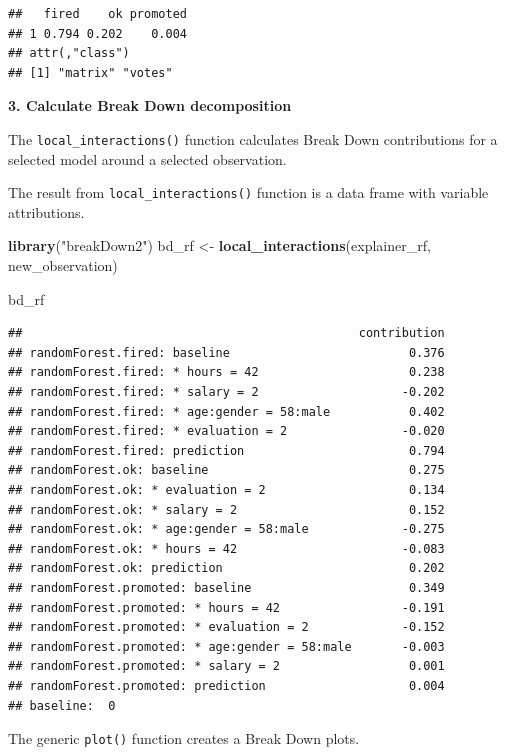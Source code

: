 \documentclass[]{krantz}
\newenvironment{Shaded}{\begin{snugshade}}{\end{snugshade}}
\newcommand{\KeywordTok}[1]{\textcolor[rgb]{0.13,0.29,0.53}{\textbf{#1}}}
\newcommand{\NormalTok}[1]{#1}
\newcommand{\StringTok}[1]{\textcolor[rgb]{0.31,0.60,0.02}{#1}}
\theoremstyle{definition}
\theoremstyle{definition}
\theoremstyle{definition}
\theoremstyle{remark}
\begin{document}
\begin{verbatim}
##   fired    ok promoted
## 1 0.794 0.202    0.004
## attr(,"class")
## [1] "matrix" "votes"
\end{verbatim}

\textbf{3. Calculate Break Down decomposition}

The \texttt{local\_interactions()} function calculates Break Down
contributions for a selected model around a selected observation.

The result from \texttt{local\_interactions()} function is a data frame
with variable attributions.

\begin{Shaded}
\begin{Highlighting}[]
\KeywordTok{library}\NormalTok{(}\StringTok{"breakDown2"}\NormalTok{)}
\NormalTok{bd_rf <-}\StringTok{ }\KeywordTok{local_interactions}\NormalTok{(explainer_rf,}
\NormalTok{                 new_observation)}

\NormalTok{bd_rf}
\end{Highlighting}
\end{Shaded}

\begin{verbatim}
##                                               contribution
## randomForest.fired: baseline                         0.376
## randomForest.fired: * hours = 42                     0.238
## randomForest.fired: * salary = 2                    -0.202
## randomForest.fired: * age:gender = 58:male           0.402
## randomForest.fired: * evaluation = 2                -0.020
## randomForest.fired: prediction                       0.794
## randomForest.ok: baseline                            0.275
## randomForest.ok: * evaluation = 2                    0.134
## randomForest.ok: * salary = 2                        0.152
## randomForest.ok: * age:gender = 58:male             -0.275
## randomForest.ok: * hours = 42                       -0.083
## randomForest.ok: prediction                          0.202
## randomForest.promoted: baseline                      0.349
## randomForest.promoted: * hours = 42                 -0.191
## randomForest.promoted: * evaluation = 2             -0.152
## randomForest.promoted: * age:gender = 58:male       -0.003
## randomForest.promoted: * salary = 2                  0.001
## randomForest.promoted: prediction                    0.004
## baseline:  0
\end{verbatim}

The generic \texttt{plot()} function creates a Break Down plots.
\end{document}
